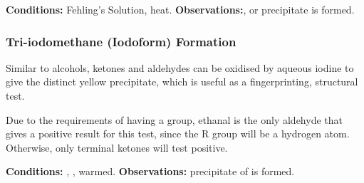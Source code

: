				\vspace{1.5em}
				\vbox{\textbf{Conditions:}	\tabto{35mm}Fehling's Solution, heat.}
				\vbox{\textbf{Observations:}\tabto{35mm}, or  precipitate is formed.}





			\subsubsection{Tri-iodomethane (Iodoform) Formation}

				Similar to alcohols, ketones and aldehydes can be oxidised by aqueous iodine to give the distinct yellow precipitate, which
				is useful as a fingerprinting, structural test.

				Due to the requirements of having a  group, ethanal is the only aldehyde that gives a positive result for this test,
				since the R group will be a hydrogen atom. Otherwise, only terminal ketones will test positive.

				\vspace{1.5em}
				\vbox{\textbf{Conditions:}	\tabto{35mm}, , warmed.}
				\vbox{\textbf{Observations:}\tabto{35mm} precipitate of  is formed.}


